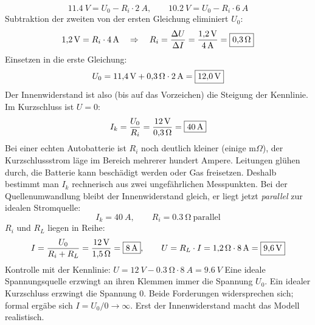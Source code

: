 \documentclass[11pt,a4paper]{article}
\begin{document}
\begin{loesung}
\[
  \SI{11.4}{V} = U_0 - R_i\cdot\SI{2}{A}, \qquad \SI{10.2}{V} = U_0 - R_i\cdot\SI{6}{A}
\]
Subtraktion der zweiten von der ersten Gleichung eliminiert $U_0$:
\[
  \SI{1.2}{V} = R_i\cdot\SI{4}{A} \quad\Rightarrow\quad R_i = \frac{\Delta U}{\Delta I} = \frac{\SI{1.2}{V}}{\SI{4}{A}} = \boxed{\SI{0.3}{\ohm}}
\]
Einsetzen in die erste Gleichung:
\[
  U_0 = \SI{11.4}{V} + \SI{0.3}{\ohm}\cdot\SI{2}{A} = \boxed{\SI{12.0}{V}}
\]
Der Innenwiderstand ist also (bis auf das Vorzeichen) die Steigung der Kennlinie.
Im Kurzschluss ist $U = 0$:
\[
  I_k = \frac{U_0}{R_i} = \frac{\SI{12}{V}}{\SI{0.3}{\ohm}} = \boxed{\SI{40}{A}}
\]
Bei einer echten Autobatterie ist $R_i$ noch deutlich kleiner (einige m$\Omega$), der Kurzschlussstrom läge im Bereich mehrerer hundert Ampere. Leitungen glühen durch, die Batterie kann beschädigt werden oder Gas freisetzen. Deshalb bestimmt man $I_k$ rechnerisch aus zwei ungefährlichen Messpunkten.
Bei der Quellenumwandlung bleibt der Innenwiderstand gleich, er liegt jetzt \emph{parallel} zur idealen Stromquelle:
\[
  I_k = \SI{40}{A}, \qquad R_i = \SI{0.3}{\ohm} \ \text{parallel}
\]
$R_i$ und $R_L$ liegen in Reihe:
\[
  I = \frac{U_0}{R_i + R_L} = \frac{\SI{12}{V}}{\SI{1.5}{\ohm}} = \boxed{\SI{8}{A}}, \qquad
  U = R_L\cdot I = \SI{1.2}{\ohm}\cdot\SI{8}{A} = \boxed{\SI{9.6}{V}}
\]
Kontrolle mit der Kennlinie: $U = \SI{12}{V} - \SI{0.3}{\ohm}\cdot\SI{8}{A} = \SI{9.6}{V}$ \checkmark
{}
Eine ideale Spannungsquelle erzwingt an ihren Klemmen immer die Spannung $U_0$. Ein idealer Kurzschluss erzwingt die Spannung $0$. Beide Forderungen widersprechen sich; formal ergäbe sich $I = U_0/0 \to \infty$. Erst der Innenwiderstand macht das Modell realistisch.
\end{loesung}
\end{document}
